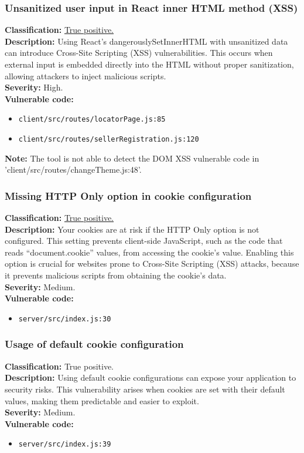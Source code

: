\documentclass[]{article}
\begin{document}
\subsubsection{Unsanitized user input in React inner HTML method (XSS)}
\textbf{Classification:} \hyperref[subsubsec:cross_site_scripting]{True positive.} \\
\textbf{Description:} Using React's dangerouslySetInnerHTML with unsanitized data can introduce Cross-Site Scripting (XSS) vulnerabilities. This occurs when external input is embedded directly into the HTML without proper sanitization, allowing attackers to inject malicious scripts. \\ 
\textbf{Severity:} High. \\ 
\textbf{Vulnerable code:}
\begin{itemize}
    \item \texttt{client/src/routes/locatorPage.js:85}
    \item \texttt{client/src/routes/sellerRegistration.js:120}
\end{itemize}
\textbf{Note:} The tool is not able to detect the DOM XSS vulnerable code in 'client/src/routes/changeTheme.js:48'. \\

\subsubsection{Missing HTTP Only option in cookie configuration}
\textbf{Classification:} \hyperref[subsubsec:sensitive_cookie_without_secure_and_httponly_attributes]{True positive.} \\
\textbf{Description:} Your cookies are at risk if the HTTP Only option is not configured. This setting prevents client-side JavaScript, such as the code that reads ``document.cookie'' values, from accessing the cookie's value. Enabling this option is crucial for websites prone to Cross-Site Scripting (XSS) attacks, because it prevents malicious scripts from obtaining the cookie's data. \\ 
\textbf{Severity:} Medium. \\ 
\textbf{Vulnerable code:}
\begin{itemize}
    \item \texttt{server/src/index.js:30}
\end{itemize}

\subsubsection{Usage of default cookie configuration}
\textbf{Classification:} True positive. \\
\textbf{Description:} Using default cookie configurations can expose your application to security risks. This vulnerability arises when cookies are set with their default values, making them predictable and easier to exploit. \\ 
\textbf{Severity:} Medium. \\ 
\textbf{Vulnerable code:}
\begin{itemize}
    \item \texttt{server/src/index.js:39}
\end{itemize}
\end{document}
